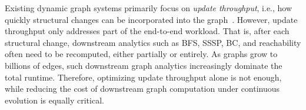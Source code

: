 Existing dynamic graph systems primarily focus on \textit{update throughput}, 
i.e., how quickly structural changes can be incorporated into the 
graph~\cite{ediger2012stinger,Busato2018Hornet,Awad2020DynamicGPU,fan2025cuckoograph}. 
However, update throughput only addresses part of the end-to-end workload. 
That is, after each structural change, downstream analytics such as BFS, SSSP, BC, 
and reachability often need to be recomputed, either partially or entirely. 
As graphs grow to billions of edges, such downstream graph analytics
increasingly dominate the total runtime. 
Therefore, optimizing update throughput alone is not enough, while reducing the cost of downstream graph computation under 
continuous evolution is equally critical.





